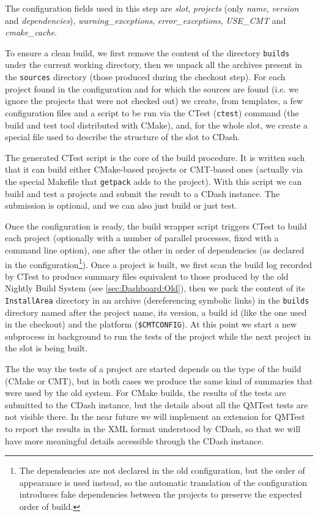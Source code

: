 The configuration fields used in this step are \emph{slot}, \emph{projects}
(only \emph{name}, \emph{version} and \emph{dependencies}),
\emph{warning\_exceptions}, \emph{error\_exceptions}, \emph{USE\_CMT} and
\emph{cmake\_cache}.

To ensure a clean build, we first remove the content of the directory
\texttt{builds} under the current working directory, then we unpack all the
archives present in the \texttt{sources} directory (those produced during the
checkout step).  For each project found in the configuration and for which the
sources are found (i.e. we ignore the projects that were not checked out) we
create, from templates, a few configuration files and a script to be run via the
CTest\cite{CMake} (\texttt{ctest}) command (the build and test tool distributed
with CMake), and, for the whole slot, we create a special file used to describe
the structure of the slot to CDash.

The generated CTest script is the core of the build procedure.  It is written
such that it can build either CMake-based projects or CMT-based\cite{CMT} ones
(actually via the special Makefile that \texttt{getpack} adds to the project).
With this script we can build and test a projects and submit the result to a
CDash instance. The submission is optional, and we can also just build or just
test.

Once the configuration is ready, the build wrapper script triggers CTest to
build each project (optionally with a number of parallel processes, fixed with a
command line option), one after the other in order of dependencies (as declared
in the configuration\footnote{The dependencies are not declared in the old
configuration, but the order of appearance is used instead, so the automatic
translation of the configuration introduces fake dependencies between the
projects to preserve the expected order of build.}).  Once a project is built,
we first scan the build log recorded by CTest to produce summary files
equivalent to those produced by the old Nightly Build System (see
\ref{sec:Dashboard:Old}), then we pack the content of its \texttt{InstallArea}
directory in an archive (dereferencing symbolic links) in the \texttt{builds}
directory named after the project name, its version, a build id (like the one
used in the checkout) and the platform (\texttt{\$CMTCONFIG}).  At this point we
start a new subprocess in background to run the tests of the project while the
next project in the slot is being built.

The the way the tests of a project are started depends on the type of the build
(CMake or CMT), but in both cases we produce the same kind of summaries that
were used by the old system.  For CMake builds, the results of the tests are
submitted to the CDash instance, but the details about all the QMTest tests are
not visible there.  In the near future we will implement an extension for QMTest
to report the results in the XML format understood by CDash, so that we will
have more meaningful details accessible through the CDash instance.

